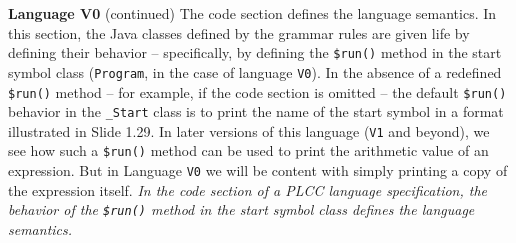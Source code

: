 \begin{minipage}[t]{\sw}
\slidenumber
\LARGE
{\bf Language V0} (continued)\exx
The code section defines the language semantics.
In this section, the Java classes defined by the grammar rules
are given life by defining their behavior --
specifically, by defining the \verb'$run()' method
in the start symbol class
(\verb'Program', in the case of language \verb'V0').\exx
In the absence of a redefined \verb'$run()' method --
for example, if the code section is omitted -- 
the default \verb'$run()' behavior in the \verb'_Start' class
is to print the name of the start symbol
in a format illustrated in Slide 1.29.\exx
In later versions of this language (\verb'V1' and beyond), 
we see how such a \verb'$run()' method can be used
to print the arithmetic value of an expression.
But in Language \verb'V0' we will be content
with simply printing a copy of the expression itself.\exx
{\em In the code section of a PLCC language specification,
the behavior of the \verb'$run()' method 
in the start symbol class
defines the language semantics.}
\end{minipage}
\clearpage
